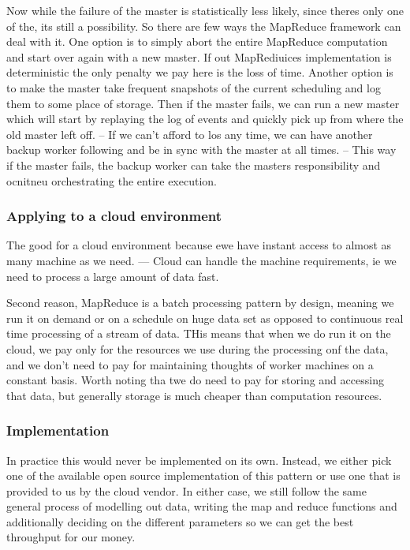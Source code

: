 \documentclass[a4paper, 11pt]{book}
\begin{document}
    Now while the failure of the master is statistically less likely, since theres only one of the, its still a possibility.
    So there are few ways the MapReduce framework can deal with it.
    One option is to simply abort the entire MapReduce computation and start over again with a new master.
    If out MapRediuices implementation is deterministic the only penalty we pay here is the loss of time.
    Another option is to make the master take frequent snapshots of the current scheduling and log them to some place of storage.
    Then if the master fails, we can run a new master which will start by replaying the log of events and quickly pick up from where the old master left off.
    -- If we can't afford to los any time, we can have another backup worker following and be in sync with the master at all times.
    -- This way if the master fails, the backup worker can take the masters responsibility and ocnitneu orchestrating the entire execution.

    \subsubsection{Applying to a cloud environment}
    The good for a cloud environment because ewe have instant access to almost as many machine as we need.
    --- Cloud can handle the machine requirements, ie we need to process a large amount of data fast.

    Second reason, MapReduce is a batch processing pattern by design, meaning we run it on demand or on a schedule on huge data set as opposed to continuous real time processing of a stream of data.
    THis means that when we do run it on the cloud, we pay only for the resources we use during the processing onf the data, and we don't need to pay for maintaining thoughts of worker machines on a constant basis.
    Worth noting tha twe do need to pay for storing and accessing that data, but generally storage is much cheaper than computation resources.

    \subsubsection{Implementation}
    In practice this would never be implemented on its own.
    Instead, we either pick one of the available open source implementation of this pattern or use one that is provided to us by the cloud vendor.
    In either case, we still follow the same general process of modelling out data, writing the map and reduce functions and additionally deciding on the different parameters so we can get the best throughput for our money.
\end{document}
